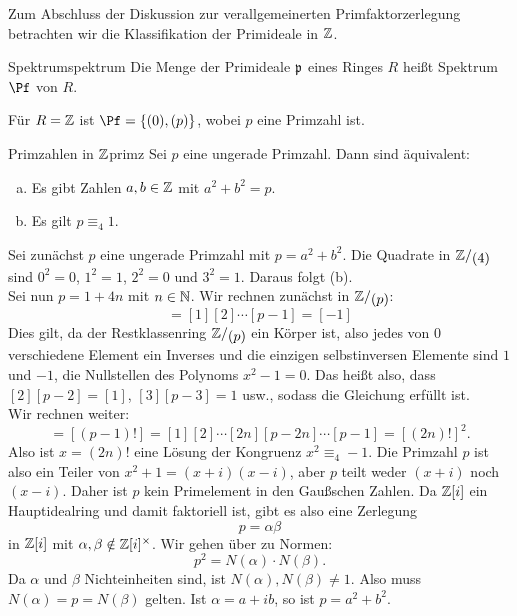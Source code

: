 Zum Abschluss der Diskussion zur verallgemeinerten Primfaktorzerlegung betrachten wir die Klassifikation der Primideale in $\mathbb{Z}$.
\begin{definition}{Spektrum}{spektrum}
Die Menge der Primideale $\mathfrak{p}$ eines Ringes $R$ heißt Spektrum $\Pf$ von $R$.
\end{definition}
\begin{bemerkung}
Für $R=\mathbb{Z}$ ist $\Pf = \{(0), (p)\}$, wobei $p$ eine Primzahl ist.
\end{bemerkung}
\begin{lemma}{Primzahlen in $\mathbb{Z}$}{primz}
Sei $p$ eine ungerade Primzahl. Dann sind äquivalent:
\begin{enumerate}[(a)]
\item Es gibt Zahlen $a,b \in \mathbb{Z}$ mit $a^2 + b^2 = p$.
\item Es gilt $p \equiv_4 1$.
\end{enumerate}
\end{lemma}
\begin{beweis}
Sei zunächst $p$ eine ungerade Primzahl mit $p = a^2 + b^2$. Die Quadrate in $\quotient{\Z}{(4)}$ sind $0^2 = 0$, $1^2 = 1$, $2^2 = 0$ und $3^2 = 1$. Daraus folgt (b).\\
Sei nun $p = 1 + 4n$ mit $n \in \mathbb{N}$. Wir rechnen zunächst in $\quotient{\Z}{(p)}$:
\begin{equation}
[(p-1)!] = [1] [2] \cdots [p-1] = [-1]
\end{equation}
Dies gilt, da der Restklassenring $\quotient{\Z}{(p)}$ ein Körper ist, also jedes von $0$ verschiedene Element ein Inverses und die einzigen selbstinversen Elemente sind $1$ und $-1$, die Nullstellen des Polynoms $x^2-1=0$. Das heißt also, dass $[2] [p-2] = [1]$, $[3][p-3]=1$ usw., sodass die Gleichung erfüllt ist.\\
Wir rechnen weiter:
\begin{equation}
[-1] = [(p-1)!] = [1][2] \cdots [2n][p-2n] \cdots [p-1]  = [(2n)!]^2.
\end{equation}
Also ist $x =(2n)!$ eine Lösung der Kongruenz $x^2 \equiv_4 -1$. Die Primzahl $p$ ist also ein Teiler von $x^2 +1 = (x+i)(x-i)$, aber $p$ teilt weder $(x+i)$ noch $(x-i)$. Daher ist $p$ kein Primelement in den Gaußschen Zahlen. Da $\mathbb{Z}[i]$ ein Hauptidealring und damit faktoriell ist, gibt es also eine Zerlegung
\begin{equation}
p = \alpha \beta
\end{equation}
in $\mathbb{Z}[i]$ mit $\alpha, \beta \notin \mathbb{Z}[i]^\times$. Wir gehen über zu Normen:
\begin{equation}
p^2 = N(\alpha) \cdot N(\beta).
\end{equation}
Da $\alpha$ und $\beta$ Nichteinheiten sind, ist $N(\alpha), N(\beta) \neq 1$. Also muss $N(\alpha) = p = N(\beta)$ gelten. Ist $\alpha = a+ib$, so ist $p = a^2 + b^2$.
\end{beweis}